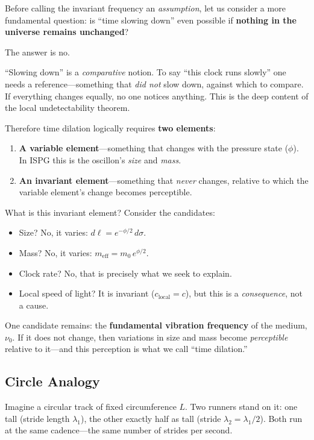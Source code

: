 \documentclass[11pt]{article}
\begin{document}
Before calling the invariant frequency an \emph{assumption}, let us
consider a more fundamental question: is ``time slowing down'' even
possible if \textbf{nothing in the universe remains unchanged}?

The answer is no.

``Slowing down'' is a \emph{comparative} notion. To say ``this clock
runs slowly'' one needs a reference---something that \emph{did not}
slow down, against which to compare. If everything changes equally,
no one notices anything. This is the deep content of the local
undetectability theorem.

Therefore time dilation logically requires \textbf{two elements}:
\begin{enumerate}
  \item \textbf{A variable element}---something that changes with
    the pressure state ($\phi$). In ISPG this is the oscillon's
    \emph{size} and \emph{mass}.
  \item \textbf{An invariant element}---something that \emph{never}
    changes, relative to which the variable element's change becomes
    perceptible.
\end{enumerate}

What is this invariant element? Consider the candidates:
\begin{itemize}
  \item Size? No, it varies: $d\ell = e^{-\phi/2}\,d\sigma$.
  \item Mass? No, it varies:
    $m_{\mathrm{eff}} = m_0\,e^{\phi/2}$.
  \item Clock rate? No, that is precisely what we seek to explain.
  \item Local speed of light? It is invariant
    ($c_{\mathrm{local}} = c$), but this is a \emph{consequence},
    not a cause.
\end{itemize}

One candidate remains: the \textbf{fundamental vibration frequency}
of the medium, $\nu_0$. If it does not change, then variations in
size and mass become \emph{perceptible} relative to it---and this
perception is what we call ``time dilation.''

\subsection{Circle Analogy}

Imagine a circular track of fixed circumference $L$. Two runners
stand on it: one tall (stride length $\lambda_1$), the other
exactly half as tall (stride $\lambda_2 = \lambda_1/2$). Both run
at the same cadence---the same number of strides per second.
\end{document}
